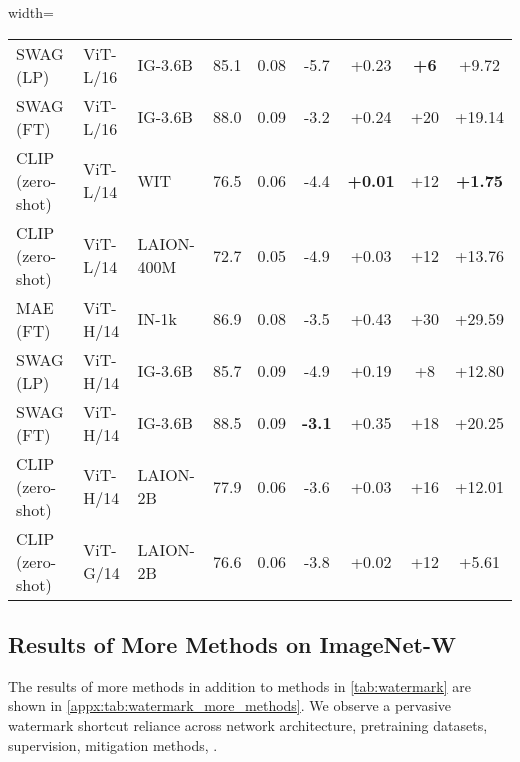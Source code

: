 \documentclass[10pt,twocolumn,letterpaper]{article}
\begin{document}
\begin{table*}[h]
\begin{adjustbox}{width=\linewidth}
\begin{tabular}{@{}lll|cc|cc|cc@{}}
SWAG (LP)    & ViT-L/16        & IG-3.6B                    & 85.1    &   0.08                  & -5.7 & +0.23 & \textbf{+6} & +9.72 \\
SWAG (FT)    & ViT-L/16        & IG-3.6B                    & 88.0    &   0.09                  & -3.2 & +0.24 & +20 & +19.14 \\
CLIP~\cite{radford2021Int.Conf.Mach.Learn.Learning} (zero-shot)   & ViT-L/14        & WIT~\cite{radford2021Int.Conf.Mach.Learn.Learning}                      & 76.5    &   0.06                  & -4.4   &  \textbf{+0.01}     & +12   & \textbf{+1.75} \\
CLIP (zero-shot)    & ViT-L/14        & LAION-400M~\cite{schuhmann2021Adv.NeuralInf.Process.Syst.WorkshopLAION400M}                      & 72.7   &    0.05                  & -4.9   &   +0.03    & +12 & +13.76  \\ \midrule
MAE (FT)    & ViT-H/14        & IN-1k                    & 86.9  &     0.08                  & -3.5 & +0.43 & +30     &  +29.59    \\
SWAG (LP)    & ViT-H/14        & IG-3.6B                    & 85.7    &   0.09                  & -4.9 & +0.19 & +8 & +12.80 \\
SWAG (FT)    & ViT-H/14        & IG-3.6B                    & 88.5    &   0.09                  & \textbf{-3.1} & +0.35 & +18 & +20.25 \\
CLIP (zero-shot)    & ViT-H/14        & LAION-2B~\cite{schuhmann2022LAION5B}                    & 77.9      &   0.06                & -3.6 & +0.03  & +16    &  +12.01       \\ \midrule
CLIP (zero-shot)   & ViT-G/14        & LAION-2B                    & 76.6      &   0.06                & -3.8 & +0.02  & +12    &  +5.61       \\
\bottomrule
\end{tabular}
\end{adjustbox}
\caption{Results of more methods (also include the methods in \cref{tab:watermark}). LP and FT stand for linear probing and fine-tuning on ImageNet-1k, respectively.}
\label{appx:tab:watermark_more_methods}
\end{table*}

\subsection{Results of More Methods on ImageNet-W}
\label{appx:subset:in_w_results_more_methods}

The results of more methods in addition to methods in \cref{tab:watermark} are shown in \cref{appx:tab:watermark_more_methods}. We observe a pervasive watermark shortcut reliance across network architecture, pretraining datasets, supervision, mitigation methods, \etc.
\end{document}
